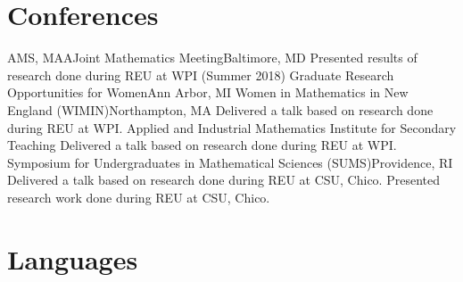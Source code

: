 \documentclass[10pt,a4paper,roman]{moderncv}        %
\begin{document}

\section{Conferences}
{AMS, MAA}{Joint Mathematics Meeting}{Baltimore, MD}
{}{Presented results of research done during REU at WPI (Summer 2018)}
{Graduate Research Opportunities for Women}{Ann Arbor, MI}{}{}
{Women in Mathematics in New England (WIMIN)}{Northampton, MA}
{}{Delivered a talk based on research done during REU at WPI.}
{Applied and Industrial Mathematics Institute for Secondary Teaching}
{Delivered a talk based on research done during REU at WPI.}
{Symposium for Undergraduates in Mathematical Sciences (SUMS)}{Providence, RI}
{}{Delivered a talk based on research done during REU at CSU, Chico.}
{}{Presented research work done during REU at CSU, Chico.}

\section{Languages}
\begin{cvcolumns}
\end{cvcolumns}

\end{document}
